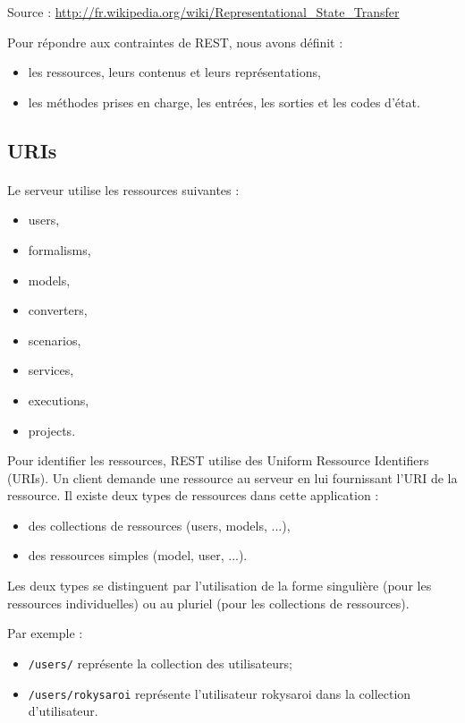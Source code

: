 \documentclass{report}
\begin{document}
\hfill{Source : \url{http://fr.wikipedia.org/wiki/Representational_State_Transfer}}

\medskip

Pour répondre aux contraintes de REST, nous avons définit : 
\begin{itemize}
\item les ressources, leurs contenus et leurs représentations,
\item les méthodes prises en charge, les entrées, les sorties et les codes d'état.
\end{itemize}

\subsection{URIs}
\paragraph{}
Le serveur utilise les ressources suivantes : 

\begin{itemize}
    \item users,
    \item formalisms,
    \item models,
    \item converters,
    \item scenarios,
    \item services,
    \item executions,
    \item projects.
\end{itemize}

Pour identifier les ressources, REST utilise des Uniform Ressource Identifiers (URIs). Un client demande une ressource au 
serveur en lui fournissant l'URI de la ressource. Il existe deux types de ressources dans cette application : \\
\begin{itemize}
  \item des collections de ressources (users, models, ...),
    \item des ressources simples (model, user, ...).
\end{itemize}

Les deux types se distinguent par l'utilisation de la forme singulière (pour les ressources individuelles) ou au pluriel (pour les
collections de ressources).

Par exemple : 
\begin{itemize}
  \item \lstinline!/users/! représente la collection des utilisateurs;
    \item \lstinline!/users/rokysaroi! représente l'utilisateur rokysaroi dans la collection d'utilisateur.
\end{itemize}
\end{document}
